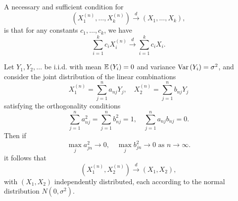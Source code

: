 \begin{theorem}
	\label{thm:convergence-in-distribution-by-linear-combinations}
	A necessary and sufficient condition for
	\begin{equation*}
		(X_{1}^{(n)},\ldots,X_k^{(n)})\stackrel{d}{\rightarrow}(X_{1},\ldots,X_k),
	\end{equation*}
	is that for any constants $c_{1},\ldots,c_k$, we have
	\begin{equation*}
		\sum_{i=1}^{k}c_{i}X_{i}^{(n)}\stackrel{d}{\rightarrow}\sum_{i=1}^{k}c_{i}X_{i}.
	\end{equation*}
\end{theorem}

\begin{example}
	Let $Y_{1},Y_{2},\ldots$ be i.i.d. with mean ${\mathbb E}\left(Y_{i}\right)=0$ and variance $\mathrm{Var}\left(Y_{i}\right)=\sigma^2$, and consider the joint distribution of the linear combinations
	\begin{equation*}
		X_{1}^{(n)}=\sum_{j=1}^{n}a_{nj}Y_{j},\quad X_{2}^{(n)}=\sum_{j=1}^{n}b_{nj}Y_{j}
	\end{equation*}
	satisfying the orthogonality conditions
	\begin{equation}
		\label{eq:orthogonality-conditions-2}
		\sum_{j=1}^{n}a_{nj}^{2}=\sum_{j=1}^{n}b_{nj}^2=1,\quad \sum_{j=1}^{n}a_{nj}b_{nj}=0.
	\end{equation}
	Then if
	\begin{equation*}
		\max_{j}a_{jn}^{2}\rightarrow 0,\quad\max_{j}b_{jn}^2\rightarrow 0 \text { as } n \rightarrow \infty .
	\end{equation*}
	it follows that
	\begin{equation*}
		(X_{1}^{(n)},X_{2}^{(n)})\stackrel{d}{\rightarrow}(X_{1},X_{2}),
	\end{equation*}
	with $(X_{1},X_{2})$ independently distributed, each according to the normal distribution $N\left(0,\sigma^2\right)$.
\end{example}

